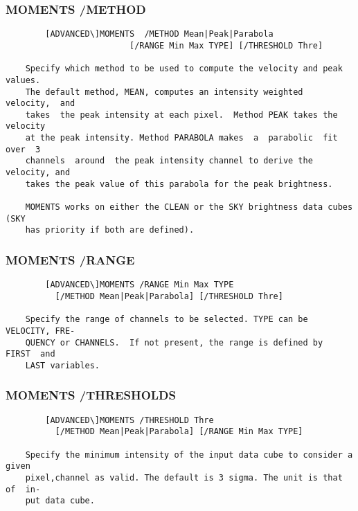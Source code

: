 \subsubsection{MOMENTS /METHOD}
\begin{verbatim}
        [ADVANCED\]MOMENTS  /METHOD Mean|Peak|Parabola
                         [/RANGE Min Max TYPE] [/THRESHOLD Thre]

    Specify which method to be used to compute the velocity and peak values.
    The default method, MEAN, computes an intensity weighted  velocity,  and
    takes  the peak intensity at each pixel.  Method PEAK takes the velocity
    at the peak intensity. Method PARABOLA makes  a  parabolic  fit  over  3
    channels  around  the peak intensity channel to derive the velocity, and
    takes the peak value of this parabola for the peak brightness.

    MOMENTS works on either the CLEAN or the SKY brightness data cubes  (SKY
    has priority if both are defined).

\end{verbatim}
\subsubsection{MOMENTS /RANGE}
\begin{verbatim}
        [ADVANCED\]MOMENTS /RANGE Min Max TYPE
          [/METHOD Mean|Peak|Parabola] [/THRESHOLD Thre]

    Specify the range of channels to be selected. TYPE can be VELOCITY, FRE-
    QUENCY or CHANNELS.  If not present, the range is defined by  FIRST  and
    LAST variables.

\end{verbatim}
\subsubsection{MOMENTS /THRESHOLDS}
\begin{verbatim}
        [ADVANCED\]MOMENTS /THRESHOLD Thre
          [/METHOD Mean|Peak|Parabola] [/RANGE Min Max TYPE]

    Specify the minimum intensity of the input data cube to consider a given
    pixel,channel as valid. The default is 3 sigma. The unit is that of  in-
    put data cube.


\end{verbatim}
